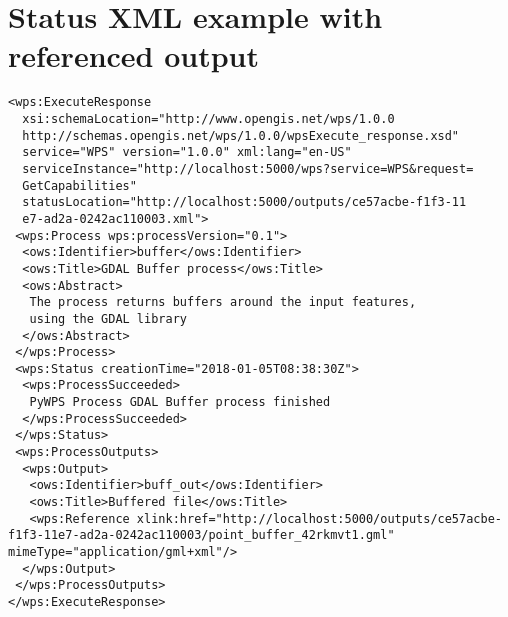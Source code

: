 \newpage
\section{Status XML example with referenced output}
\label{app:status_reference}
\begin{lstlisting}[basicstyle=\small,caption={Status XML example}]
<wps:ExecuteResponse
  xsi:schemaLocation="http://www.opengis.net/wps/1.0.0 
  http://schemas.opengis.net/wps/1.0.0/wpsExecute_response.xsd" 
  service="WPS" version="1.0.0" xml:lang="en-US"
  serviceInstance="http://localhost:5000/wps?service=WPS&request=
  GetCapabilities" 
  statusLocation="http://localhost:5000/outputs/ce57acbe-f1f3-11
  e7-ad2a-0242ac110003.xml">
 <wps:Process wps:processVersion="0.1">
  <ows:Identifier>buffer</ows:Identifier>
  <ows:Title>GDAL Buffer process</ows:Title>
  <ows:Abstract>
   The process returns buffers around the input features,
   using the GDAL library
  </ows:Abstract>
 </wps:Process>
 <wps:Status creationTime="2018-01-05T08:38:30Z">
  <wps:ProcessSucceeded>
   PyWPS Process GDAL Buffer process finished
  </wps:ProcessSucceeded>
 </wps:Status>
 <wps:ProcessOutputs>
  <wps:Output>
   <ows:Identifier>buff_out</ows:Identifier>
   <ows:Title>Buffered file</ows:Title>
   <wps:Reference xlink:href="http://localhost:5000/outputs/ce57acbe-f1f3-11e7-ad2a-0242ac110003/point_buffer_42rkmvt1.gml" mimeType="application/gml+xml"/>
  </wps:Output>
 </wps:ProcessOutputs>
</wps:ExecuteResponse>
\end{lstlisting}

